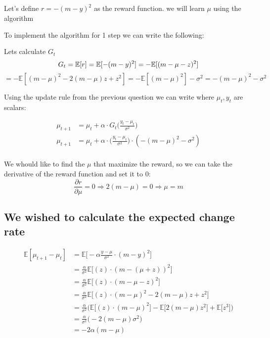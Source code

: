 \documentclass{article}
\begin{document}
    \subsection{}
    Let's define $r = -(m-y)^2$ as the reward function. we will learn $\mu$ using the algorithm
    
    To implement the algorithm for 1 step we can write the following:

    Lets calculate $G_t$
    \[
    G_t = \mathbb{E}[r] = \mathbb{E}[-(m-y)^2] = -\mathbb{E}[(m-\mu - z)^2] \\
    \]
    \[
    = -\mathbb{E}[(m-\mu)^2 - 2(m-\mu)z + z^2] = -\mathbb{E}[(m-\mu)^2] - \sigma^2 = -(m-\mu)^2 - \sigma^2
    \]

    Using the update rule from the previous question we can write where $\mu_t , y_t$ are scalars:

    \begin{equation}
        \begin{split}
            \mu_{t+1} &= \mu_t + \alpha \cdot G_t  \Bigg(  \frac{y_t-\mu_t}{\sigma^2} \Bigg)\\
            \mu_{t+1} &= \mu_t + \alpha \cdot   \Bigg(  \frac{y_t-\mu_t}{\sigma^2} \Bigg) \cdot (-(m-\mu)^2-\sigma^2)\\
        \end{split}
    \end{equation}

    We whould like to find the $\mu$ that maximize the reward, so we can take the derivative of the reward function and set it to 0:
    \[
    \frac{\partial r}{\partial \mu} = 0 \Rightarrow 2(m-\mu) = 0 \Rightarrow \mu = m
    \]



    \subsection{We wished to calculate the expected change rate}
    \begin{equation}
        \begin{split}
            \mathbb{E}[\mu_{t+1}-\mu_{t}] &= \mathbb{E}\bigg[-\alpha \frac{y - \mu}{\sigma^2} \cdot (m-y)^2\bigg]\\
             &= \frac{\alpha}{\sigma^2}\mathbb{E}\bigg[(z) \cdot (m-(\mu + z))^2\bigg]\\
                &= \frac{\alpha}{\sigma^2}\mathbb{E}\bigg[(z) \cdot (m-\mu - z)^2\bigg]\\
                &= \frac{\alpha}{\sigma^2}\mathbb{E}\bigg[(z) \cdot (m-\mu)^2 - 2(m-\mu)z + z^2\bigg]\\
                &= \frac{\alpha}{\sigma^2}\bigg(\mathbb{E}\Bigg[(z) \cdot (m-\mu)^2 \bigg] - \mathbb{E}\bigg[2(m-\mu)z^2\bigg] +\mathbb{E}\bigg[ z^3\bigg]\Bigg)\\
                &= \frac{\alpha}{\sigma^2}\bigg( - 2(m-\mu)\sigma^2\Bigg)\\
                &= -2\alpha(m-\mu)
            \end{split}
    \end{equation}
\end{document}
